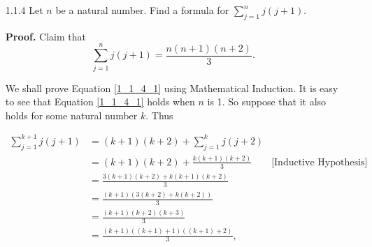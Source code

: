\begin{enumerate}
                  \begin{equation}
                     \sum_{j=1}^nj^2 = \frac{n(n+1)(2n+1)}{6}.\label{1_1_3_1}
                  \end{equation}

      \textbf{Proof.} We shall prove that \eqref{1_1_3_1} holds by Mathematical 
      Induction. Let $S(n)$ be the statement that \eqref{1_1_3_1} holds. It is 
      evident that $S(1)$ holds. So suppose that for some natural number $k$ 
      that $S(k)$ is true.

      Now
      \begin{align*}
         S(k+1) &= \sum_{j=1}^{k+1}j^2 \\
                &= (k + 1)^2 + \sum_{j=1}^kj^2 \\
                &= (k + 1)^2 + \frac{k(k+1)(2k+1)}{6} \qquad
                   \text{[Inductive Hypothesis]}\\
                &= \frac{6(k + 1)^2 + k(k+1)(2k+1)}{6} \\
                &= \frac{(k + 1)(6(k + 1) + k(2k+1))}{6} \\
                &= \frac{(k + 1)(2k^2 + 7k + 6)}{6} \\
                &= \frac{(k + 1)((k + 1) + 1)(2(k + 1) + 1)}{6}.
      \end{align*}

      That is, $S(k + 1)$ holds. Thus $S(n)$ holds for all natural numbers. \qed
   \item[1.1.4]   Let $n$ be a natural number. Find a formula for
                  $\sum_{j = 1}^n j(j + 1)$.

      \textbf{Proof.} Claim that
      \begin{equation}
         \sum_{j=1}^nj(j + 1) = \frac{n(n+1)(n+2)}{3}.\label{1_1_4_1}
      \end{equation}

      We shall prove Equation \eqref{1_1_4_1} using Mathematical Induction. It
      is easy to see that Equation \eqref{1_1_4_1} holds when $n$ is 1. So
      suppose that it also holds for some natural number $k$. Thus

      \begin{align*}
         \sum_{j=1}^{k+1}j(j + 1) &= (k + 1)(k + 2) + \sum_{j=1}^kj(j + 2) \\
                &= (k + 1)(k + 2) + \frac{k(k+1)(k+2)}{3}  \qquad
                   \text{[Inductive Hypothesis]} \\
                &= \frac{3(k + 1)(k + 2) + k(k+1)(k+2)}{3} \\
                &= \frac{(k + 1)(3(k + 2) + k(k+2))}{3} \\
                &= \frac{(k + 1)(k + 2)(k + 3)}{3} \\
                &= \frac{(k + 1)((k + 1)+1)((k + 1)+2)}{3}, \\
      \end{align*}


\end{enumerate}
